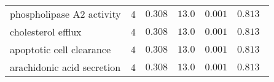 \begin{longtable*}{|l|r|r|r|r|r|}
    phospholipase A2 activity                             & 4                       & $ 0.308$                & $  13.0$     & $ 0.001$             & $ 0.813~~$                      \\
    cholesterol efflux                                    & 4                       & $ 0.308$                & $  13.0$     & $ 0.001$             & $ 0.813~~$                      \\
    apoptotic cell clearance                              & 4                       & $ 0.308$                & $  13.0$     & $ 0.001$             & $ 0.813~~$                      \\
    arachidonic acid secretion                            & 4                       & $ 0.308$                & $  13.0$     & $ 0.001$             & $ 0.813~~$                      \\
\end{longtable*}
